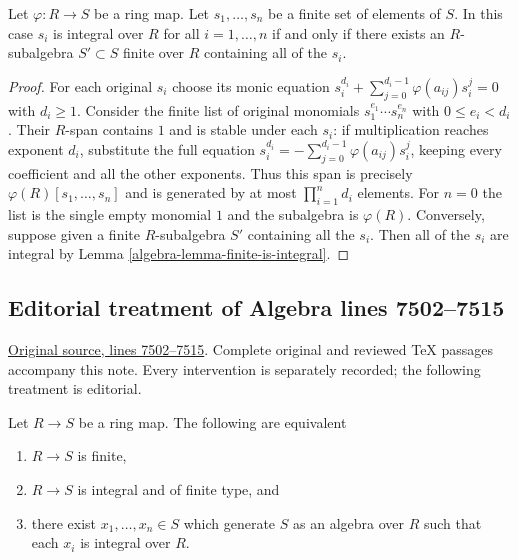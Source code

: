 \begin{lemma}
\label{editorial-source-lemma-characterize-integral}
Let $\varphi : R \to S$ be a ring map. Let $s_1, \ldots, s_n$
be a finite set of elements of $S$.
In this case $s_i$ is integral over $R$ for all $i = 1, \ldots, n$
if and only if
there exists an $R$-subalgebra $S' \subset S$ finite over $R$
containing all of the $s_i$.
\end{lemma}

\begin{proof}
For each original $s_i$ choose its monic equation
$s_i^{d_i}+\sum_{j=0}^{d_i-1}\varphi(a_{ij})s_i^j=0$ with
$d_i\geq1$. Consider the finite list of original monomials
$s_1^{e_1}\cdots s_n^{e_n}$ with $0\leq e_i<d_i$.
Their $R$-span contains $1$ and is stable under each $s_i$:
if multiplication reaches exponent $d_i$, substitute the full equation
$s_i^{d_i}=-\sum_{j=0}^{d_i-1}\varphi(a_{ij})s_i^j$, keeping every
coefficient and all the other exponents. Thus this span is precisely
$\varphi(R)[s_1,\ldots,s_n]$ and is generated by at most
$\prod_{i=1}^n d_i$ elements. For $n=0$ the list is the single
empty monomial $1$ and the subalgebra is $\varphi(R)$.
Conversely, suppose given a finite $R$-subalgebra
$S'$ containing all the $s_i$. Then all of the
$s_i$ are integral by Lemma \ref{algebra-lemma-finite-is-integral}.
\end{proof}


\subsection{Editorial treatment of Algebra lines 7502--7515}

\hypertarget{algebra-context-071}{}

\noindent\href{https://github.com/stacks/stacks-project/blob/a04446e57ec1fbc252a871afcec7752fb2807b14/algebra.tex\#L7502}{Original source, lines 7502--7515}. Complete original and reviewed TeX passages accompany this note. Every intervention is separately recorded; the following treatment is editorial.


\begin{lemma}
\label{editorial-source-lemma-characterize-finite-in-terms-of-integral}
Let $R \to S$ be a ring map. The following are equivalent
\begin{enumerate}
\item $R \to S$ is finite,
\item $R \to S$ is integral and of finite type, and
\item there exist $x_1, \ldots, x_n \in S$ which generate $S$ as an
algebra over $R$ such that each $x_i$ is integral over $R$.
\end{enumerate}
\end{lemma}


